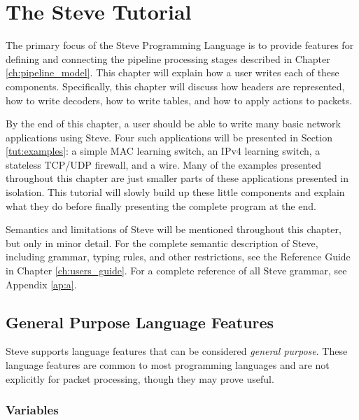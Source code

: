 \chapter{The Steve Tutorial} \label{ch:tutorial}

%

The primary focus of the Steve Programming Language is to provide features for
defining and connecting the pipeline processing stages described in Chapter
\ref{ch:pipeline_model}. This chapter will explain how a user writes each of these
components. Specifically, this chapter will discuss how headers are represented, how to
write decoders, how to write tables, and how to apply actions to packets.

By the end of this chapter, a user should be able to write many basic network
applications using Steve. Four such applications will be presented in Section \ref{tut:examples}: a simple MAC
learning switch, an IPv4 learning switch, a stateless TCP/UDP firewall, and a wire. Many of the examples
presented throughout this chapter are just smaller parts of these applications
presented in isolation. This tutorial will slowly build
up these little components and explain what they do before finally presenting
the complete program at the end.

Semantics and limitations of Steve will be mentioned throughout this chapter, 
but only in minor detail. For the complete semantic description of
Steve, including grammar, typing rules, and other restrictions, see the Reference Guide in Chapter \ref{ch:users_guide}. For a complete reference of all Steve
grammar, see Appendix \ref{ap:a}.

\section{General Purpose Language Features} \label{tut:gen_purp}

Steve supports language features that can be considered
\textit{general purpose}. These language features are common to most programming
languages and are not explicitly for packet processing, though they may prove
useful.

\subsection{Variables} \label{tut:variable}

